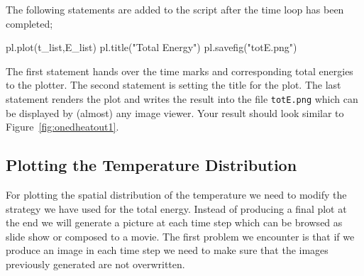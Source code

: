 The following statements are added to the script after the time loop has been completed;
\begin{python}
pl.plot(t_list,E_list)
pl.title("Total Energy")
pl.savefig("totE.png")
\end{python}
The first statement hands over the time marks and corresponding total energies to the plotter. 
The second statement is setting the title for the plot. The last statement renders the plot and writes the 
result into the file \verb|totE.png| which can be displayed by (almost) any image viewer. Your result should look
similar to Figure~\ref{fig:onedheatout1}.

\subsection{Plotting the Temperature Distribution}
For plotting the spatial distribution of the temperature we need to modify the strategy we have used
for the total energy. Instead of producing a final plot at the end we will generate a 
picture at each time step which can be browsed as slide show or composed to a movie.
The first problem we encounter is that if we produce an image in each time step we need
to make sure that the images previously generated are not overwritten.

